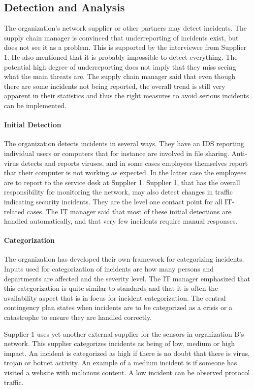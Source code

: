 \subsection{Detection and Analysis}
The organization's network supplier or other partners may detect incidents. The supply chain manager is convinced that underreporting of incidents exist, but does not see it as a problem. This is supported by the interviewee from Supplier 1. He also mentioned that it is probably impossible to detect everything. The potential high degree of underreporting does not imply that they miss seeing what the main threats are. The supply chain manager said that even though there are some incidents not being reported, the overall trend is still very apparent in their statistics and thus the right measures to avoid serious incidents can be implemented. 

\paragraph{Initial Detection}
The organization detects incidents in several ways. They have an \ac{IDS} reporting individual users or computers that for instance are involved in file sharing. Anti-virus detects and reports viruses, and in some cases employees themselves report that their computer is not working as expected. In the latter case the employees are to report to the service desk at Supplier 1. Supplier 1, that has the overall responsibility for monitoring the network, may also detect changes in traffic indicating security incidents. They are the level one contact point for all IT-related cases. The IT manager said that most of these initial detections are handled automatically, and that very few incidents require manual responses. 

\paragraph{Categorization}
The organization has developed their own framework for categorizing incidents. Inputs used for categorization of incidents are how many persons and departments are affected and the severity level. The IT manager emphasized that this categorization is quite similar to standards and that it is often the availability aspect that is in focus for incident categorization. The central contingency plan states when incidents are to be categorized as a crisis or a catastrophe to ensure they are handled correctly.

Supplier 1 uses yet another external supplier for the sensors in organization B's network. This supplier categorizes incidents as being of low, medium or high impact. An incident is categorized as high if there is no doubt that there is virus, trojan or botnet activity. An example of a medium incident is if someone has visited a website with malicious content. A low incident can be observed protocol traffic.

